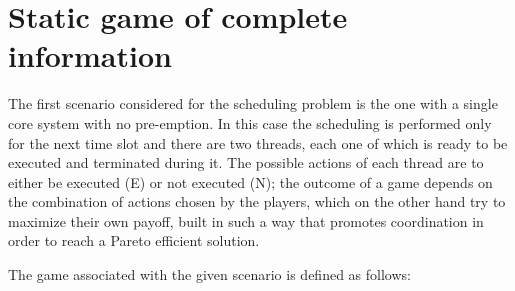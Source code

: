 \newpage
\section{Static game of complete information}

The first scenario considered for the scheduling problem is the one with a
single core system with no pre-emption. In this case the scheduling is
performed only for the next time slot and there are two threads, each one of
which is ready to be executed and terminated during it. The possible actions
of each thread are to either be executed (E) or not executed (N); the
outcome of a game depends on the combination of actions chosen by the players,
which on the other hand try to maximize their own payoff, built in such a way
that promotes coordination in order to reach a Pareto efficient solution.

The game associated with the given scenario is defined as follows:

